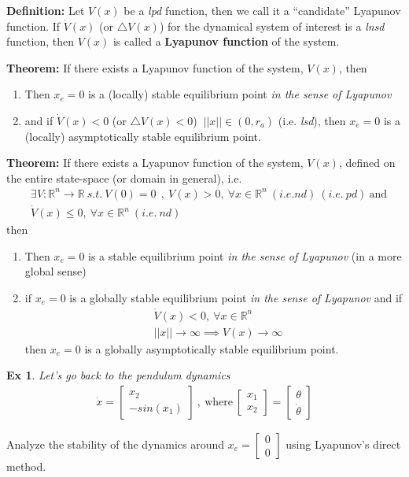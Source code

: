 \documentclass[twoside]{article}
\newtheorem{exmp}[theorem]{Ex}
\begin{document}
\textbf{Definition:} Let $V(x)$ be a \textit{lpd} function, then we call it a ``candidate'' Lyapunov function. 
If $\dot{V}(x)$ (or $\triangle V(x)$) for the dynamical system of interest is a \textit{lnsd} function, then 
$V(x)$ is called a \textbf{Lyapunov function} of the system.

\textbf{Theorem:} If there exists a Lyapunov function of the system, $V(x)$, then
\begin{enumerate}
    \item Then $x_e = 0$ is a (locally) stable equilibrium point \textit{in the sense of Lyapunov}
    \item and if $\dot{V}(x) < 0$ (or $\triangle V(x) < 0$) $\ || x || \in (0 , r_a)$ (i.e. \textit{lsd}), then 
    $x_e = 0$ is a (locally) asymptotically stable equilibrium point.
\end{enumerate}

\textbf{Theorem:} If there exists a Lyapunov function of the system, $V(x)$, defined on the entire state-space (or domain in general), i.e. 
\begin{align*}
    &\exists V: \mathbb{R}^n \to \mathbb{R} \ s.t. \ V(0) = 0 \ 
    \ , \
    V(x) > 0, \ \forall x \in \mathbb{R}^n \ (i.e. nd) \ (i.e. \ pd) \ \mathrm{and}
    \\
    &\dot{V}(x) \leq 0, \ \forall x \in \mathbb{R}^n \ (i.e. \ nd)
\end{align*}
then 
\begin{enumerate}
    \item Then $x_e = 0$ is a stable equilibrium point \textit{in the sense of Lyapunov} (in a more global sense)
%    
    \item if $x_e = 0$ is a globally stable equilibrium point \textit{in the sense of Lyapunov} and if 
    \begin{align*}
    &\dot{V}(x) < 0, \ \forall x \in \mathbb{R}^n
    \\
    &|| x || \to \infty \implies V(x) \to \infty
\end{align*}
then $x_e = 0$ is a globally asymptotically stable equilibrium point.
\end{enumerate}

\begin{exmp}
    Let's go back to the pendulum dynamics
    \begin{align*}
    \dot{x} = \begin{bmatrix} x_2 \\ -sin(x_1)\end{bmatrix} \ , \ \mathrm{where} \ \begin{bmatrix} x_1 \\ x_2 \end{bmatrix} = \begin{bmatrix}  \theta \\ \dot{\theta} \end{bmatrix}
\end{align*}
\end{exmp}
Analyze the stability of the dynamics around $x_e = \begin{bmatrix} 0 \\ 0 \end{bmatrix}$ using Lyapunov's direct method.
\end{document}
